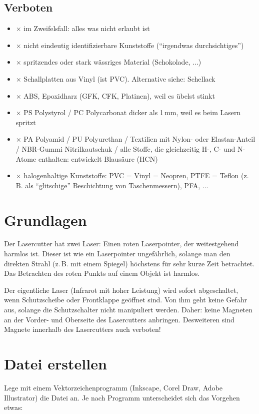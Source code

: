\documentclass{\basedir/fablab-document}
\begin{document}
	\newpage %

	\subsection{Verboten}
	\newcommand{\itemCross}{\item[$\times$]}
	\begin{itemize}
		\itemCross im Zweifelsfall: alles was nicht erlaubt ist
		\itemCross nicht eindeutig identifizierbare Kunststoffe (\enquote{irgendwas durchsichtiges})
		\itemCross spritzendes oder stark wässriges Material (Schokolade, ...)
		\itemCross Schallplatten aus Vinyl (ist PVC). Alternative siehe: Schellack
		\itemCross ABS, Epoxidharz (GFK, CFK, Platinen), weil es übelst stinkt
		\itemCross PS Polystyrol / PC Polycarbonat dicker als 1\,mm, weil es beim Lasern spritzt
		\itemCross PA Polyamid / PU Polyurethan / Textilien mit Nylon- oder Elastan-Anteil / NBR-Gummi Nitrilkautschuk / alle Stoffe, die gleichzeitig H-, C- und N-Atome enthalten: entwickelt Blausäure (HCN)
		\itemCross halogenhaltige Kunststoffe: PVC = Vinyl = Neopren, PTFE = Teflon (z.\,B. als \enquote{glitschige} Beschichtung von Taschenmessern), PFA, ...
	\end{itemize}

	\section{Grundlagen}
	Der Lasercutter hat zwei Laser: Einen roten Laserpointer, der weitestgehend harmlos ist. Dieser ist wie ein Laserpointer ungefährlich, solange man den direkten Strahl (z.\,B. mit einem Spiegel) höchstens für sehr kurze Zeit betrachtet. Das Betrachten des roten Punkts auf einem Objekt ist harmlos.

	Der eigentliche Laser (Infrarot mit hoher Leistung) wird sofort abgeschaltet, wenn Schutzscheibe oder Frontklappe geöffnet sind. Von ihm geht keine Gefahr aus, solange die Schutzschalter nicht manipuliert werden. Daher: keine Magneten an der Vorder- und Oberseite des Lasercutters anbringen. Desweiteren sind Magnete innerhalb des Lasercutters auch verboten!

	\section{Datei erstellen}
	Lege mit einem Vektorzeichenprogramm (Inkscape, Corel Draw, Adobe Illustrator) die Datei an. Je nach Programm unterscheidet sich das Vorgehen etwas:
\end{document}
